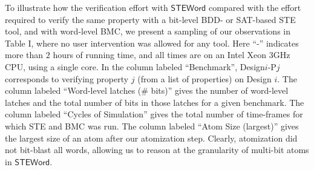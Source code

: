 \documentclass{llncs}
\newcommand{\steword}{\ensuremath{\mathsf{STEWord}}}
\begin{document}
To illustrate how the verification effort with {\steword} compared
with the effort required to verify the same property with a bit-level
BDD- or SAT-based STE tool, and with word-level BMC, we present a
sampling of our observations in Table I, where no user intervention
was allowed for any tool.  Here ``-'' indicates more than $2$ hours
of running time, and all times are on an Intel Xeon 3GHz CPU, using
a single core.  In the column labeled ``Benchmark'',
Design$i$-P$j$ corresponds to verifying property $j$ (from a list of
properties) on Design $i$.  The column labeled ``Word-level latches
(\# bits)'' gives the number of word-level latches and the total
number of bits in those latches for a given benchmark.  The column
labeled ``Cycles of Simulation'' gives the total number of time-frames
for which STE and BMC was run.  The column labeled ``Atom Size
(largest)'' gives the largest size of an atom after our atomization
step.  Clearly, atomization did not bit-blast all words,
allowing us to reason at the granularity of multi-bit atoms in {\steword}.
\end{document}
